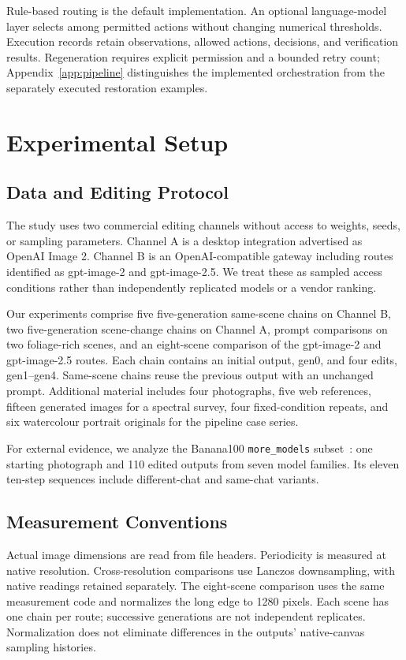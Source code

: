 \documentclass[sigplan,10pt,nonacm]{acmart}
\begin{document}
Rule-based routing is the default implementation. An optional language-model layer selects among permitted actions without changing numerical thresholds. Execution records retain observations, allowed actions, decisions, and verification results. Regeneration requires explicit permission and a bounded retry count; Appendix~\ref{app:pipeline} distinguishes the implemented orchestration from the separately executed restoration examples.

\section{Experimental Setup}
\label{sec:methods}
\subsection{Data and Editing Protocol}
The study uses two commercial editing channels without access to weights, seeds, or sampling parameters. 
Channel A is a desktop integration advertised as OpenAI Image 2. 
Channel B is an OpenAI-compatible gateway including routes identified as gpt-image-2 and gpt-image-2.5. 
We treat these as sampled access conditions rather than independently replicated models or a vendor ranking.

Our experiments comprise five five-generation same-scene chains on Channel B, two five-generation scene-change chains on Channel A, prompt comparisons on two foliage-rich scenes, and an eight-scene comparison of the gpt-image-2 and gpt-image-2.5 routes. Each chain contains an initial output, gen0, and four edits, gen1--gen4. Same-scene chains reuse the previous output with an unchanged prompt. Additional material includes four photographs, five web references, fifteen generated images for a spectral survey, four fixed-condition repeats, and six watercolour portrait originals for the pipeline case series.

For external evidence, we analyze the Banana100 \texttt{more\_models} subset~\cite{banana100data}: one starting photograph and 110 edited outputs from seven model families. Its eleven ten-step sequences include different-chat and same-chat variants.

\subsection{Measurement Conventions}
Actual image dimensions are read from file headers. Periodicity is measured at native resolution. Cross-resolution comparisons use Lanczos downsampling, with native readings retained separately. The eight-scene comparison uses the same measurement code and normalizes the long edge to 1280 pixels. Each scene has one chain per route; successive generations are not independent replicates. Normalization does not eliminate differences in the outputs' native-canvas sampling histories.
\end{document}
